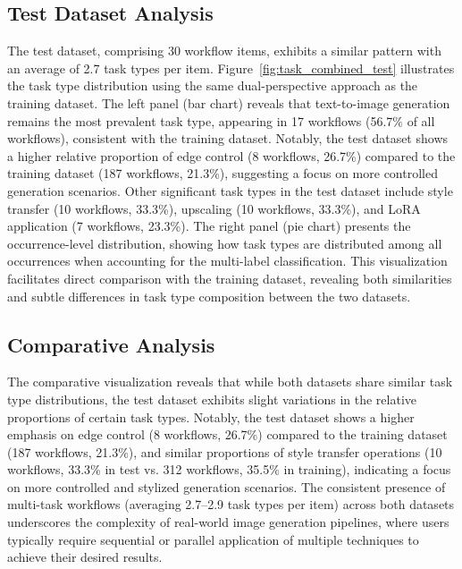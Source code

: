 \documentclass[runningheads]{llncs}
\begin{document}
\subsection{Test Dataset Analysis}

The test dataset, comprising 30 workflow items, exhibits a similar pattern with an average of 2.7 task types per item. Figure~\ref{fig:task_combined_test} illustrates the task type distribution using the same dual-perspective approach as the training dataset. The left panel (bar chart) reveals that text-to-image generation remains the most prevalent task type, appearing in 17 workflows (56.7\% of all workflows), consistent with the training dataset. Notably, the test dataset shows a higher relative proportion of edge control (8 workflows, 26.7\%) compared to the training dataset (187 workflows, 21.3\%), suggesting a focus on more controlled generation scenarios. Other significant task types in the test dataset include style transfer (10 workflows, 33.3\%), upscaling (10 workflows, 33.3\%), and LoRA application (7 workflows, 23.3\%). The right panel (pie chart) presents the occurrence-level distribution, showing how task types are distributed among all occurrences when accounting for the multi-label classification. This visualization facilitates direct comparison with the training dataset, revealing both similarities and subtle differences in task type composition between the two datasets.

\subsection{Comparative Analysis}

The comparative visualization reveals that while both datasets share similar task type distributions, the test dataset exhibits slight variations in the relative proportions of certain task types. Notably, the test dataset shows a higher emphasis on edge control (8 workflows, 26.7\%) compared to the training dataset (187 workflows, 21.3\%), and similar proportions of style transfer operations (10 workflows, 33.3\% in test vs. 312 workflows, 35.5\% in training), indicating a focus on more controlled and stylized generation scenarios. The consistent presence of multi-task workflows (averaging 2.7--2.9 task types per item) across both datasets underscores the complexity of real-world image generation pipelines, where users typically require sequential or parallel application of multiple techniques to achieve their desired results.
\end{document}
